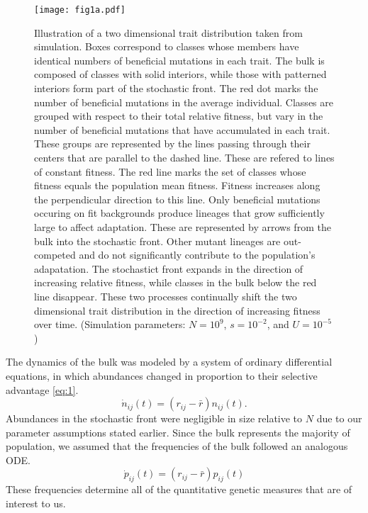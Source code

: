 \documentclass[11pt,twocolumn]{article}
\begin{document}
\begin{figure}[h!]
\texttt{[image: fig1a.pdf]}
\label{Figure 1.}
\caption{\footnotesize Illustration of a two dimensional trait distribution taken from simulation. Boxes correspond to classes whose members have identical numbers of beneficial mutations in each trait. The bulk is composed of classes with solid interiors, while those with patterned interiors form part of the stochastic front. The red dot marks the number of beneficial mutations in the average individual. Classes are grouped with respect to their total relative fitness, but vary in the number of beneficial mutations that have accumulated in each trait. These groups are represented by the lines passing through their centers that are parallel to the dashed line. These are refered to lines of constant fitness. The red line marks the set of classes whose fitness equals the population mean fitness. Fitness increases along the perpendicular direction to this line. Only beneficial mutations occuring on fit backgrounds produce lineages that grow sufficiently large to affect adaptation. These are represented by arrows from the bulk into the stochastic front. Other mutant lineages are out-competed and do not significantly contribute to the population's adapatation. The stochastict front expands in the direction of increasing relative fitness, while classes in the bulk below the red line disappear. These two processes continually shift the two dimensional trait distribution in the direction of increasing fitness over time. (Simulation parameters: $N=10^9$, $s=10^{-2}$, and $U=10^{-5}$)}
\end{figure}


The dynamics of the bulk was modeled by a system of ordinary differential equations, in which abundances changed in proportion to their selective advantage \eqref{eq:1}. 
\begin{equation} \label{eq:1}
\dot{n}_{ij}(t) = (r_{ij}-\bar{r}) n_{ij}(t). 
\end{equation}
Abundances in the stochastic front were negligible in size relative to $N$ due to our parameter assumptions stated earlier.  Since the bulk represents the majority of population, we assumed that the frequencies of the bulk followed an analogous ODE.
\begin{equation} \label{eq:2}
\dot{p}_{ij}(t) = (r_{ij}-\bar{r}) p_{ij}(t) 
\end{equation}
These frequencies determine all of the quantitative genetic measures that are of interest to us.\par
\end{document}
